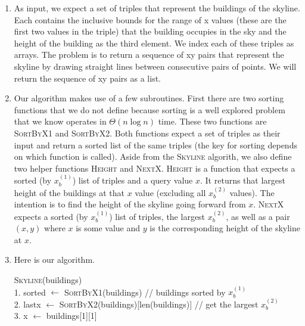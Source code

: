 \documentclass{article}
\begin{document}
\begin{enumerate}
    \item As input, we expect a set of triples that represent the buildings of the skyline.
    Each contains the inclusive bounds for the range of x values (these are the first two values in the triple) that the building occupies in the sky  and the height of the building as the third element.
    We index each of these triples as arrays.
    The problem is to return a sequence of xy pairs that represent the skyline by drawing straight lines between consecutive pairs of points.
    We will return the sequence of xy pairs as a list.
    \item Our algorithm makes use of a few subroutines.
    First there are two sorting functions that we do not define because sorting is a well explored problem that we know operates in $\Theta (n \log n)$ time.
    These two functions are \textsc{SortByX1} and \textsc{SortByX2}.
    Both functions expect a set of triples as their input and return a sorted list of the same triples (the key for sorting depends on which function is called). \parspace
    Aside from the \textsc{Skyline} algorith, we also define two helper functions \textsc{Height} and \textsc{NextX}.
    \textsc{Height} is a function that expects a sorted (by $x_b^{(1)}$) list of triples and a query value $x$.
    It returns that largest height of the buildings at that $x$ value (excluding all $x_b^{(2)}$ values).
    The intention is to find the height of the skyline going forward from $x$.
    \textsc{NextX} expects a sorted (by $x_b^{(1)}$) list of triples, the largest $x_b^{(2)}$, as well as a pair $(x, y)$ where $x$ is some value and $y$ is the corresponding height of the skyline at $x$.
    \item Here is our algorithm.
    \begin{algorithm}
        \textsc{Skyline}(buildings) \\
        1. \hspace{0em} sorted $\leftarrow$ \textsc{SortByX1}(buildings) \hspace{2em} // buildings sorted by $x_b^{(1)}$ \\
        2. \hspace{0em} lastx $\leftarrow$ \textsc{SortByX2}(buildings)[len(buildings)] \hspace{2em} // get the largest $x_b^{(2)}$\\
        3. \hspace{0em} x $\leftarrow$ buildings[1][1] \\

\end{algorithm}
\end{enumerate}
\end{document}
